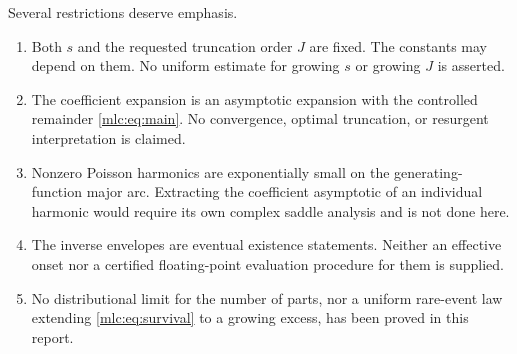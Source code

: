 \documentclass[11pt]{article}
\theoremstyle{remark}\newtheorem{remark}[theorem]{Remark}
\begin{document}
Several restrictions deserve emphasis.
\begin{enumerate}
 \item Both $s$ and the requested truncation order $J$ are fixed. The constants may depend on them. No uniform estimate for growing $s$ or growing $J$ is asserted.
 \item The coefficient expansion is an asymptotic expansion with the controlled remainder \eqref{mlc:eq:main}. No convergence, optimal truncation, or resurgent interpretation is claimed.
 \item Nonzero Poisson harmonics are exponentially small on the generating-function major arc. Extracting the coefficient asymptotic of an individual harmonic would require its own complex saddle analysis and is not done here.
 \item The inverse envelopes are eventual existence statements. Neither an effective onset nor a certified floating-point evaluation procedure for them is supplied.
 \item No distributional limit for the number of parts, nor a uniform rare-event law extending \eqref{mlc:eq:survival} to a growing excess, has been proved in this report.
\end{enumerate}
\end{document}
